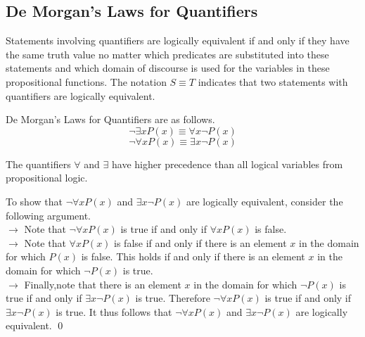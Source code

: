 \documentclass{article}
\newtheorem{definition}{Definition}[subsection]
\newtheorem{theorem}{Theorem}[subsection]
\newtheorem{remark}{Remark}[subsection]
\begin{document}
\subsection{De Morgan's Laws for Quantifiers}
\begin{tcolorbox}
[colback=blue!5!white,colframe=blue!75!black,title=\begin{definition}
\end{definition}]
Statements involving quantifiers are logically equivalent if and only if they have the same truth value no matter which predicates are substituted into these statements and which domain of discourse is used for the variables in these propositional functions. The notation $S\equiv T$ indicates that two statements with quantifiers are logically equivalent.
\end{tcolorbox}
\begin{tcolorbox}
[colback=green!5!white,colframe=green!75!black,title=\begin{theorem}
\end{theorem}]
De Morgan's Laws for Quantifiers are as follows.
$$\neg \exists xP(x)\equiv \forall x\neg P(x)$$
$$\neg \forall xP(x)\equiv \exists x\neg P(x)$$
\end{tcolorbox}
\begin{tcolorbox}
[colback=cyan!5!white,colframe=cyan!75!black,title=\begin{remark}
\end{remark}]
The quantifiers $\forall$ and $\exists$ have higher precedence than all logical variables from propositional logic.
\end{tcolorbox}
\begin{tcolorbox}
[colback=cyan!5!white,colframe=cyan!75!black,title=\begin{remark}
\end{remark}]
To show that $\neg \forall xP(x)$ and $\exists x\neg P(x)$ are logically equivalent, consider the following argument.\\
$\longrightarrow$ Note that $\neg \forall xP(x)$ is true if and only if $\forall xP(x)$ is false.\\
$\longrightarrow$ Note that $\forall xP(x)$ is false if and only if there is an element $x$ in the domain for which $P(x)$ is false. This holds if and only if there is an element $x$ in the domain for which $\neg P(x)$ is true.\\
$\longrightarrow$ Finally,note that there is an element $x$ in the domain for which $\neg P(x)$ is true if and only if $\exists x\neg P(x)$ is true. Therefore $\neg\forall xP(x)$ is true if and only if $\exists x\neg P(x)$ is true. It thus follows that $\neg \forall xP(x)$ and $\exists x\neg P(x)$ are logically equivalent. \qed
\end{tcolorbox}
\end{document}
